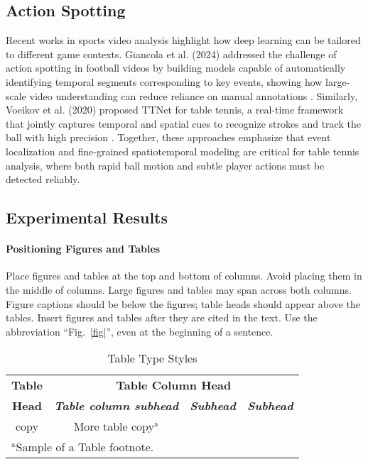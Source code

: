 \documentclass[conference]{IEEEtran}
\begin{document}
\subsection{Action Spotting}

Recent works in sports video analysis highlight how deep learning can be tailored to different game contexts. Giancola et al. (2024) addressed the challenge of action spotting in football videos by building models capable of automatically identifying temporal segments corresponding to key events, showing how large-scale video understanding can reduce reliance on manual annotations \cite{giancola}. Similarly, Voeikov et al. (2020) proposed TTNet for table tennis, a real-time framework that jointly captures temporal and spatial cues to recognize strokes and track the ball with high precision \cite{ttnet}. Together, these approaches emphasize that event localization and fine-grained spatiotemporal modeling are critical for table tennis analysis, where both rapid ball motion and subtle player actions must be detected reliably.

\subsection{Experimental Results}
\paragraph{Positioning Figures and Tables} Place figures and tables at the top and 
bottom of columns. Avoid placing them in the middle of columns. Large 
figures and tables may span across both columns. Figure captions should be 
below the figures; table heads should appear above the tables. Insert 
figures and tables after they are cited in the text. Use the abbreviation 
``Fig.~\ref{fig}'', even at the beginning of a sentence.

\begin{table}[htbp]
\caption{Table Type Styles}
\begin{center}
\begin{tabular}{|c|c|c|c|}
\hline
\textbf{Table}&\multicolumn{3}{|c|}{\textbf{Table Column Head}} \\
\cline{2-4} 
\textbf{Head} & \textbf{\textit{Table column subhead}}& \textbf{\textit{Subhead}}& \textbf{\textit{Subhead}} \\
\hline
copy& More table copy$^{\mathrm{a}}$& &  \\
\hline
\multicolumn{4}{l}{$^{\mathrm{a}}$Sample of a Table footnote.}
\end{tabular}
\label{tab1}
\end{center}
\end{table}



\end{document}
